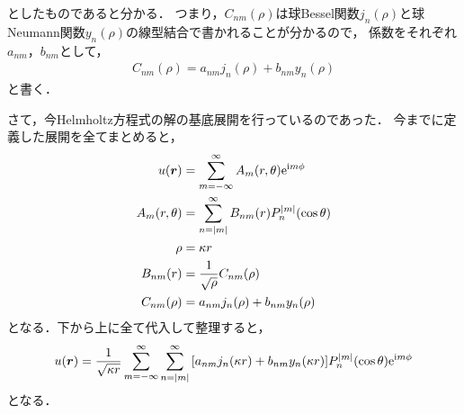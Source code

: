 \documentclass{report}
\begin{document}
    としたものであると分かる．
    つまり，$C_{nm}(\rho)$は球Bessel関数$j_n(\rho)$と球Neumann関数$y_n(\rho)$の線型結合で書かれることが分かるので，
    係数をそれぞれ$a_{nm}$，$b_{nm}$として，
    \begin{align}
      C_{nm}(\rho) = a_{nm}j_n(\rho) + b_{nm}y_n(\rho) 
    \end{align}
    と書く．
    \par
    さて，今Helmholtz方程式の解の基底展開を行っているのであった．
    今までに定義した展開を全てまとめると，
    \begin{align}
      u(\bm{r}) &= \sum_{m = -\infty}^{\infty} A_m(r, \theta) \mathrm{e}^{\mathrm{i} m\phi} \\ 
      A_m(r, \theta) &= \sum_{n = \abs{m}}^{\infty}B_{nm}(r)P_{n}^{\abs{m}}(\cos\theta) \\ 
      \rho &= \kappa r \\ 
      B_{nm}(r) &= \frac{1}{\sqrt{\rho}}C_{nm}(\rho) \\ 
      C_{nm}(\rho) &= a_{nm}j_n(\rho) + b_{nm}y_n(\rho) 
    \end{align}
    となる．下から上に全て代入して整理すると，
    \begin{align}
      u(\bm{r}) = \frac{1}{\sqrt{\kappa r}} \sum_{m = -\infty}^{\infty}\sum_{n = \abs{m}}^{\infty}\qty[a_{nm}j_n(\kappa r) + b_{nm}y_n(\kappa r)] P_{n}^{\abs{m}}(\cos\theta)\mathrm{e}^{\mathrm{i} m\phi}
    \end{align}
    となる．
\end{document}
